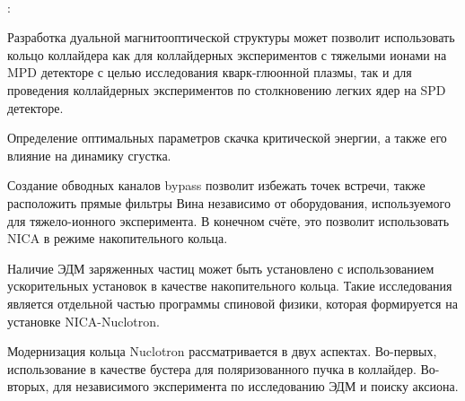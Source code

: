 ~\\
\par {\influence}:
\par Разработка дуальной магнитооптической структуры может позволит использовать кольцо коллайдера как для коллайдерных экспериментов с тяжелыми ионами на MPD детекторе с целью исследования кварк-глюонной плазмы, так и для проведения коллайдерных экспериментов по столкновению легких ядер на SPD детекторе.
\par Определение оптимальных параметров скачка критической энергии, а также его влияние на динамику сгустка. 
\par Создание обводных каналов bypass позволит избежать точек встречи, также расположить прямые фильтры Вина независимо от оборудования, используемого для тяжело-ионного эксперимента. В конечном счёте, 
это позволит использовать NICA в режиме накопительного кольца.
\par Наличие ЭДМ заряженных частиц может быть установлено с использованием ускорительных установок в качестве накопительного кольца. Такие исследования является отдельной частью программы спиновой физики, которая формируется на установке NICA-Nuclotron.
\par Модернизация кольца Nuclotron рассматривается в двух аспектах. Во-первых, использование в качестве бустера для поляризованного пучка в коллайдер. Во-вторых, для независимого эксперимента по исследованию ЭДМ и поиску аксиона.

